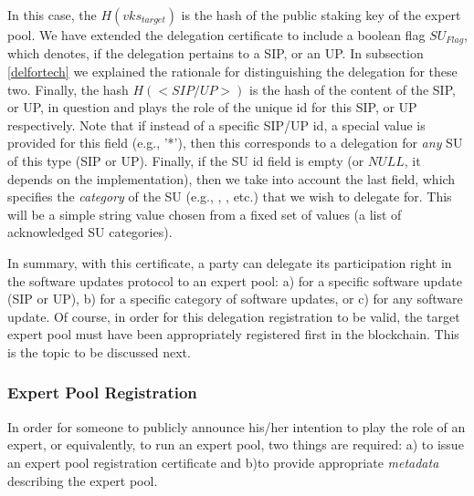 In this case, the $H(vks_{target})$ is the hash of the public staking key of the
expert pool. We have extended the delegation certificate to include a boolean
flag $SU_{Flag}$, which denotes, if the delegation pertains to a SIP, or an UP.
In subsection \ref{delfortech} we explained the rationale
for distinguishing the delegation for these two. Finally, the hash $H(<SIP/UP>)$
is the hash of the content of the SIP, or UP, in question and plays the role of
the unique id for this SIP, or UP respectively. Note that if instead of a
specific SIP/UP id, a special value is provided for this field (e.g., '*'), then
this corresponds to a delegation for \emph{any} SU of this type (SIP or UP).
Finally, if the SU id field is empty (or $NULL$, it depends on the
implementation), then we take into account the last field, which specifies the
\emph{category} of the SU (e.g., , , etc.)
that we wish to delegate for. This will be a simple string value chosen from a
fixed set of values (a list of acknowledged SU categories).

In summary, with this certificate, a party can delegate its participation right
in the software updates protocol to an expert pool: a) for a specific software
update (SIP or UP), b) for a specific category of software updates, or c) for
any software update. Of course, in order for this delegation registration to be
valid, the target expert pool must have been appropriately registered first in
the blockchain. This is the topic to be discussed next.

\subsubsection*{Expert Pool Registration}
In order for someone to publicly announce his/her intention to play the role of
an expert, or equivalently, to run an expert pool, two things are required: a)
to issue an expert pool registration certificate and b)to provide appropriate
\emph{metadata} describing the expert pool.

